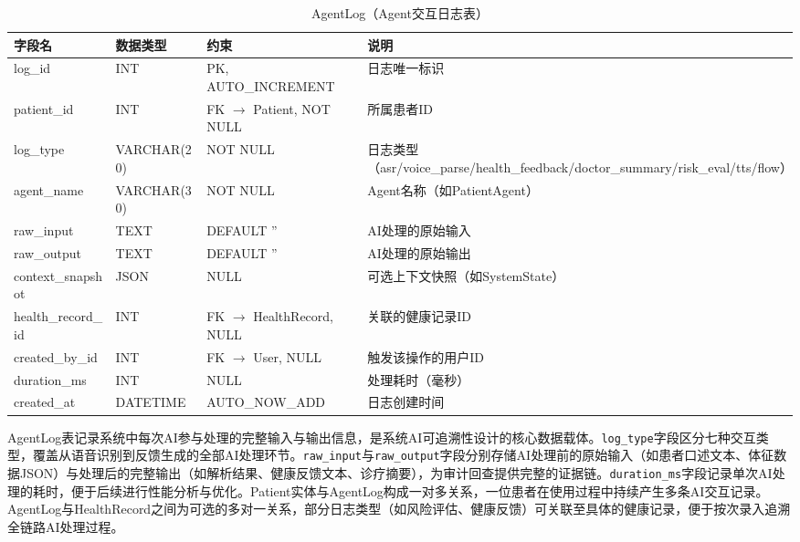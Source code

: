 \begin{table}[H]
\centering
\caption{AgentLog（Agent交互日志表）}
\label{tab:table-agentlog}
\begin{tabularx}{\textwidth}{|l|l|l|X|}
\hline
\textbf{字段名} & \textbf{数据类型} & \textbf{约束} & \textbf{说明} \\
\hline
log\_id & INT & PK, AUTO\_INCREMENT & 日志唯一标识 \\
\hline
patient\_id & INT & FK $\rightarrow$ Patient, NOT NULL & 所属患者ID \\
\hline
log\_type & VARCHAR(20) & NOT NULL & 日志类型（asr/voice\_parse/health\_feedback/doctor\_summary/risk\_eval/tts/flow） \\
\hline
agent\_name & VARCHAR(30) & NOT NULL & Agent名称（如PatientAgent） \\
\hline
raw\_input & TEXT & DEFAULT '' & AI处理的原始输入 \\
\hline
raw\_output & TEXT & DEFAULT '' & AI处理的原始输出 \\
\hline
context\_snapshot & JSON & NULL & 可选上下文快照（如SystemState） \\
\hline
health\_record\_id & INT & FK $\rightarrow$ HealthRecord, NULL & 关联的健康记录ID \\
\hline
created\_by\_id & INT & FK $\rightarrow$ User, NULL & 触发该操作的用户ID \\
\hline
duration\_ms & INT & NULL & 处理耗时（毫秒） \\
\hline
created\_at & DATETIME & AUTO\_NOW\_ADD & 日志创建时间 \\
\hline
\end{tabularx}
\end{table}

AgentLog表记录系统中每次AI参与处理的完整输入与输出信息，是系统AI可追溯性设计的核心数据载体。\texttt{log\_type}字段区分七种交互类型，覆盖从语音识别到反馈生成的全部AI处理环节。\texttt{raw\_input}与\texttt{raw\_output}字段分别存储AI处理前的原始输入（如患者口述文本、体征数据JSON）与处理后的完整输出（如解析结果、健康反馈文本、诊疗摘要），为审计回查提供完整的证据链。\texttt{duration\_ms}字段记录单次AI处理的耗时，便于后续进行性能分析与优化。Patient实体与AgentLog构成一对多关系，一位患者在使用过程中持续产生多条AI交互记录。AgentLog与HealthRecord之间为可选的多对一关系，部分日志类型（如风险评估、健康反馈）可关联至具体的健康记录，便于按次录入追溯全链路AI处理过程。


